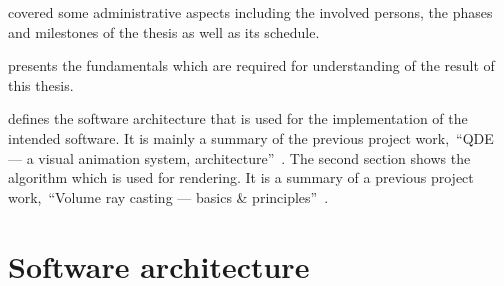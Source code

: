 \documentclass[%
    a4paper,    %
    justified,  %
    nobib,      %
    openany     %
]{tufte-book}
\begin{document}
 covered some administrative aspects including the
involved persons, the phases and milestones of the thesis as well as its
schedule.

 presents the fundamentals which are required for
understanding of the result of this thesis.

 defines the software architecture
that is used for the implementation of the intended software. It is mainly a
summary of the previous project work,~\enquote{QDE --- a visual animation
system, architecture}~\cite{osterwalder_qde_2016}. The second section shows the
algorithm which is used for rendering. It is a summary of a previous project
work,~\enquote{Volume ray casting --- basics \&
principles}~\cite{osterwalder_volume_2016}.

\section{Software architecture}
\label{sec:architecture}
\end{document}
